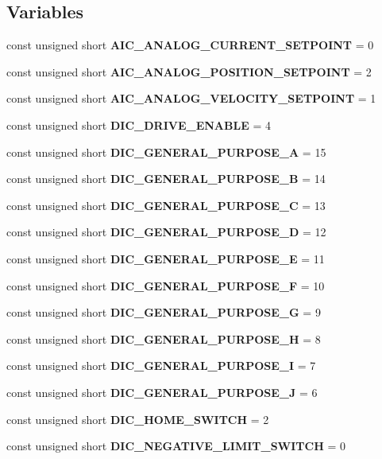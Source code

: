 \subsection*{\-Variables}
\begin{DoxyCompactItemize}
\item 
const unsigned short {\bf \-A\-I\-C\-\_\-\-A\-N\-A\-L\-O\-G\-\_\-\-C\-U\-R\-R\-E\-N\-T\-\_\-\-S\-E\-T\-P\-O\-I\-N\-T} = 0
\item 
const unsigned short {\bf \-A\-I\-C\-\_\-\-A\-N\-A\-L\-O\-G\-\_\-\-P\-O\-S\-I\-T\-I\-O\-N\-\_\-\-S\-E\-T\-P\-O\-I\-N\-T} = 2
\item 
const unsigned short {\bf \-A\-I\-C\-\_\-\-A\-N\-A\-L\-O\-G\-\_\-\-V\-E\-L\-O\-C\-I\-T\-Y\-\_\-\-S\-E\-T\-P\-O\-I\-N\-T} = 1
\item 
const unsigned short {\bf \-D\-I\-C\-\_\-\-D\-R\-I\-V\-E\-\_\-\-E\-N\-A\-B\-L\-E} = 4
\item 
const unsigned short {\bf \-D\-I\-C\-\_\-\-G\-E\-N\-E\-R\-A\-L\-\_\-\-P\-U\-R\-P\-O\-S\-E\-\_\-\-A} = 15
\item 
const unsigned short {\bf \-D\-I\-C\-\_\-\-G\-E\-N\-E\-R\-A\-L\-\_\-\-P\-U\-R\-P\-O\-S\-E\-\_\-\-B} = 14
\item 
const unsigned short {\bf \-D\-I\-C\-\_\-\-G\-E\-N\-E\-R\-A\-L\-\_\-\-P\-U\-R\-P\-O\-S\-E\-\_\-\-C} = 13
\item 
const unsigned short {\bf \-D\-I\-C\-\_\-\-G\-E\-N\-E\-R\-A\-L\-\_\-\-P\-U\-R\-P\-O\-S\-E\-\_\-\-D} = 12
\item 
const unsigned short {\bf \-D\-I\-C\-\_\-\-G\-E\-N\-E\-R\-A\-L\-\_\-\-P\-U\-R\-P\-O\-S\-E\-\_\-\-E} = 11
\item 
const unsigned short {\bf \-D\-I\-C\-\_\-\-G\-E\-N\-E\-R\-A\-L\-\_\-\-P\-U\-R\-P\-O\-S\-E\-\_\-\-F} = 10
\item 
const unsigned short {\bf \-D\-I\-C\-\_\-\-G\-E\-N\-E\-R\-A\-L\-\_\-\-P\-U\-R\-P\-O\-S\-E\-\_\-\-G} = 9
\item 
const unsigned short {\bf \-D\-I\-C\-\_\-\-G\-E\-N\-E\-R\-A\-L\-\_\-\-P\-U\-R\-P\-O\-S\-E\-\_\-\-H} = 8
\item 
const unsigned short {\bf \-D\-I\-C\-\_\-\-G\-E\-N\-E\-R\-A\-L\-\_\-\-P\-U\-R\-P\-O\-S\-E\-\_\-\-I} = 7
\item 
const unsigned short {\bf \-D\-I\-C\-\_\-\-G\-E\-N\-E\-R\-A\-L\-\_\-\-P\-U\-R\-P\-O\-S\-E\-\_\-\-J} = 6
\item 
const unsigned short {\bf \-D\-I\-C\-\_\-\-H\-O\-M\-E\-\_\-\-S\-W\-I\-T\-C\-H} = 2
\item 
const unsigned short {\bf \-D\-I\-C\-\_\-\-N\-E\-G\-A\-T\-I\-V\-E\-\_\-\-L\-I\-M\-I\-T\-\_\-\-S\-W\-I\-T\-C\-H} = 0

\end{DoxyCompactItemize}
